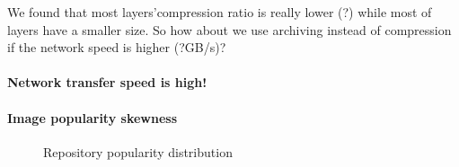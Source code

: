 

We found that most layers'compression ratio is really lower (?) while most of layers have a smaller size. 
So how about we use archiving instead of compression if the network speed is higher (?GB/s)?

\paragraph{Network transfer speed is high!}

\paragraph{Image popularity skewness} 

\begin{figure}[!t]
	\centering
	\caption{Repository popularity distribution}
	\label{fig-pop}
\end{figure}

